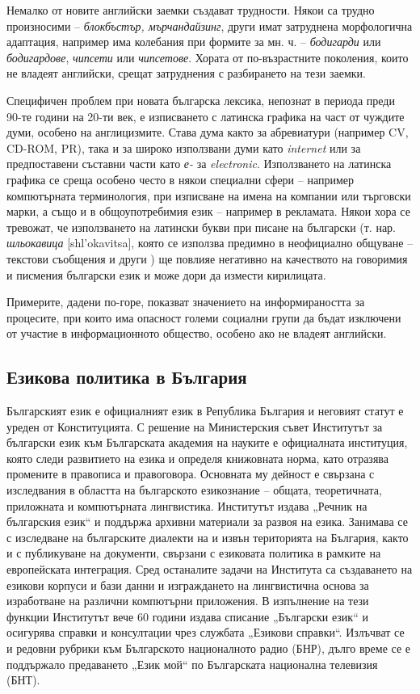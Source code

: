\begin{multicols}{2}
  Немалко от новите
   английски заемки създават трудности. Някои са трудно
   произносими – {\it блокбъстър, мърчандайзинг}, други имат
   затруднена морфологична адаптация, например има
   колебания при формите за мн. ч. – {\it бодигарди} или
  {\it бодигардове}, {\it чипсети} или {\it чипсетове}. Хората от по-възрастните поколения, които
   не владеят английски, срещат затруднения с разбирането на тези заемки.

  Специфичен проблем при новата българска лексика, непознат в периода преди 90-те години на 20-ти век, е изписването с латинска графика на част от чуждите думи, особено на англицизмите. Става дума както за абревиатури (например CV, CD-ROM, PR), така и за широко използвани думи като \textit{internet} или за предпоставени съставни части като \textit{е-} за {\it electronic}. Използването на латинска графика се среща
   особено често в някои специални сфери – например компютърната терминология, при изписване на имена на компании или търговски марки, а също и в общоупотребимия език – например в рекламата.
   Някои хора се тревожат, че използването на латински букви при писане на български (т. нар. \textit{шльокавица} [shl'okavitsa], която се използва предимно в неофициално общуване – текстови съобщения и други \cite{shlyokavica}) ще повлияе негативно на качеството на говоримия и писмения български език и може дори да измести кирилицата.

  Примерите, дадени по-горе, показват значението на информираността за процесите, при които има опасност големи социални
   групи
   да
   бъдат
   изключени
   от
   участие
   в
   информационното общество, особено ако не владеят
   английски.

  \subsection{Езикова политика в България}


  Българският език е официалният език в Република България и неговият статут е уреден от Конституцията. С
   решение на Министерския съвет Институтът за български език към Българската академия на науките е
   официалната институция, която следи развитието на
   езика и определя книжовната норма, като отразява промените в правописа и правоговора. Основната му дейност е свързана с изследвания в областта на българското езикознание – общата, теоретичната, приложната и компютърната лингвистика. Институтът издава „Речник на българския език“ и поддържа архивни
   материали за развоя на езика. Занимава се с изследване
   на българските диалекти на и извън територията на
   България, както и с публикуване на документи, свързани
   с езиковата политика в рамките на европейската
   интеграция. Сред останалите задачи на Института са
   създаването на езикови корпуси и бази данни и
   изграждането на лингвистична основа за изработване на
   различни компютърни приложения. В изпълнение на
   тези функции Институтът вече 60 години издава
   списание „Български език“ и
   осигурява справки и консултации чрез службата
   „Езикови справки“. Излъчват се и редовни рубрики към
   Българското националното радио (БНР), дълго време се е поддържало предаването „Език
   мой“ по Българската национална телевизия (БНТ).


\end{multicols}
